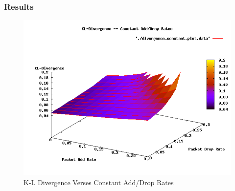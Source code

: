 \documentclass{usenixsubmit}
\begin{document}
\subsubsection{Results}
\begin{figure}
	\centering
		\includegraphics[scale=0.5]{./plots/divergence_constant_plot.png}
	\caption{K-L Divergence Verses Constant Add/Drop Rates}
	\label{fig:divplot}
\end{figure}
\end{document}
